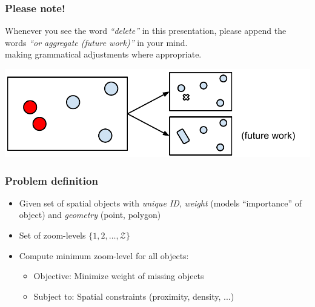 \documentclass{beamer}
\begin{document}
\frame
{
  \frametitle{Please note!}
  Whenever you see the word \emph{``delete''} in this presentation, please append the words \emph{``or aggregate (future work)''} in your mind. \\
  making grammatical adjustments where appropriate.
  
  \begin{center}
  \includegraphics[scale=0.50]{figs/cvl-delete-aggregate.pdf}
  \end{center}

}


\frame
{
  \frametitle{Problem definition}
  \begin{itemize}
  \item Given set of spatial objects with \emph{unique ID}, \emph{weight} (models ``importance'' of object) and \emph{geometry} (point, polygon)
  \item Set of zoom-levels $\lbrace 1, 2, \dots, \mathcal{Z} \rbrace$
  \item Compute minimum zoom-level for all objects:
  \begin{itemize}
  \item Objective: Minimize weight of missing objects
  \item Subject to: Spatial constraints (proximity, density, ...)
  \end{itemize}
  \end{itemize}
  \begin{center}
  \end{center}
}
\end{document}
